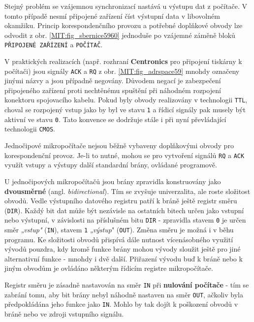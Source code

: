      Stejný problém se vzájemnou synchronizací nastává u výstupu dat z počítače. V tomto případě 
      nesmí připojené zařízení číst výstupní data v libovolném okamžiku. Princip korespondenčního 
      provozu a potřebné doplňkové obvody lze odvodit z obr. \ref{MIT:fig_sbernice5960} jednoduše 
      po vzájemné záměně bloků \texttt{PŘIPOJENÉ ZAŘÍZENÍ} a \texttt{POČÍTAČ}.
      
      V praktických realizacích (např. rozhraní \textbf{Centronics} pro připojení tiskárny k 
      počítači) jsou signály \texttt{ACK} a \texttt{RQ} z obr. \ref{MIT:fig_adrspace59} mnohdy 
      označeny jinými názvy a jsou případně negovány. Důvodem negací je zabezpečení připojeného 
      zařízení proti nechtěnému spuštění při náhodném rozpojení konektoru spojovacího kabelu. Pokud 
      byly obvody realizovány v technologii \texttt{TTL}, choval se rozpojený vstup jako by byl ve 
      stavu \texttt{1} a řídicí signály pak musely být aktivní ve stavu \texttt{0}. Tato konvence 
      se dodržuje stále i při nyní převládající technologii \texttt{CMOS}.
      
      Jednočipové mikropočítače nejsou běžně vybaveny doplňkovými obvody pro korespondenční provoz. 
      Je-li to nutné, mohou se pro vytvoření signálů \texttt{RQ} a \texttt{ACK} využít vstupy a 
      výstupy další standardní brány, ovládané programově.
      
      U jednočipových mikropočítačů jsou brány zpravidla konstruovány jako \textbf{dvousměrné} 
      (angl. \emph{bidirectional}). Tím se zvyšuje univerzalita, ale roste složitost obvodů. Vedle 
      výstupního  datového registru patří k bráně ještě registr směru (\texttt{DIR}). Každý bit dat 
      může být nezávisle na ostatních bitech určen jako vstupní nebo výstupní, v závislosti na 
      příslušném bitu \texttt{DIR} - zpravidla stavem \texttt{0} je určen směr \emph{„vstup"} 
      (\texttt{IN}), stavem \texttt{1} \emph{„výstup}" (\texttt{OUT}). Změna směru je možná i v 
      běhu programu. Ke složitosti obvodů přispívá dále nutnost vícenásobného využití vývodů 
      pouzdra, kdy kromě funkce brány mohou vývody sloužit ještě pro jiné alternativní funkce - 
      mnohdy i dvě další. Přiřazení vývodu buď k bráně nebo k jiným obvodům je ovládáno některým 
      řídicím registre mikropočítače.
      
      Registr směru je zásadně nastavován na směr \texttt{IN} při \textbf{nulování počítače} - tím 
      se zabrání tomu, aby bit brány nebyl náhodně nastaven na směr \texttt{OUT}, ačkoliv byla 
      předpokládána jeho funkce jako \texttt{IN}. Mohlo by tak dojít k poškození obvodů v bráně 
      nebo ve zdroji vstupního signálu.
      
